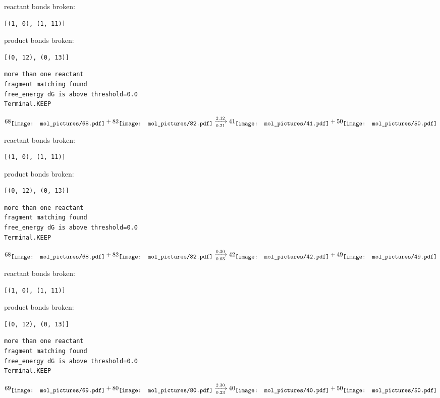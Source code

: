 \documentclass{article}
\begin{document}
reactant bonds broken:\begin{verbatim}
[(1, 0), (1, 11)]
\end{verbatim}
product bonds broken:\begin{verbatim}
[(0, 12), (0, 13)]
\end{verbatim}




\vspace{1cm}
\begin{verbatim}
more than one reactant
fragment matching found
free_energy dG is above threshold=0.0
Terminal.KEEP
\end{verbatim}
$$
68
\raisebox{-.5\height}{\texttt{[image: mol\_pictures/68.pdf]}}
+
82
\raisebox{-.5\height}{\texttt{[image: mol\_pictures/82.pdf]}}
\xrightarrow[0.21]{2.12}
41
\raisebox{-.5\height}{\texttt{[image: mol\_pictures/41.pdf]}}
+
50
\raisebox{-.5\height}{\texttt{[image: mol\_pictures/50.pdf]}}
$$


reactant bonds broken:\begin{verbatim}
[(1, 0), (1, 11)]
\end{verbatim}
product bonds broken:\begin{verbatim}
[(0, 12), (0, 13)]
\end{verbatim}




\vspace{1cm}
\begin{verbatim}
more than one reactant
fragment matching found
free_energy dG is above threshold=0.0
Terminal.KEEP
\end{verbatim}
$$
68
\raisebox{-.5\height}{\texttt{[image: mol\_pictures/68.pdf]}}
+
82
\raisebox{-.5\height}{\texttt{[image: mol\_pictures/82.pdf]}}
\xrightarrow[0.03]{0.30}
42
\raisebox{-.5\height}{\texttt{[image: mol\_pictures/42.pdf]}}
+
49
\raisebox{-.5\height}{\texttt{[image: mol\_pictures/49.pdf]}}
$$


reactant bonds broken:\begin{verbatim}
[(1, 0), (1, 11)]
\end{verbatim}
product bonds broken:\begin{verbatim}
[(0, 12), (0, 13)]
\end{verbatim}




\vspace{1cm}
\begin{verbatim}
more than one reactant
fragment matching found
free_energy dG is above threshold=0.0
Terminal.KEEP
\end{verbatim}
$$
69
\raisebox{-.5\height}{\texttt{[image: mol\_pictures/69.pdf]}}
+
80
\raisebox{-.5\height}{\texttt{[image: mol\_pictures/80.pdf]}}
\xrightarrow[0.23]{2.30}
40
\raisebox{-.5\height}{\texttt{[image: mol\_pictures/40.pdf]}}
+
50
\raisebox{-.5\height}{\texttt{[image: mol\_pictures/50.pdf]}}
$$
\end{document}
